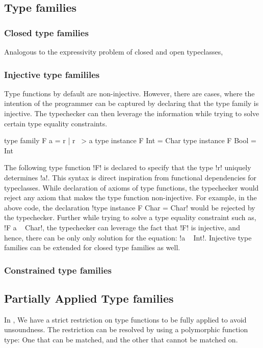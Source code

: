\documentclass[manuscript,screen,nonacm]{acmart}
\begin{document}
\subsection{Type families}
\subsubsection{Closed type families}
Analogous to the expressivity problem of closed and open typeclasses,

\subsubsection{Injective type famililes}
Type functions by default are non-injective. However, there are cases, where the intention of the programmer can be captured by declaring that the type family is injective. The typechecker can then leverage the information while trying to solve certain type equality constraints.

\begin{CenteredBox}
\begin{code}
type family F a = r | r ~> a
type instance F Int = Char
type instance F Bool = Int
\end{code}
\end{CenteredBox}

The following type function !F! is declared to specify that the type !r! uniquely determines !a!. This syntax is direct inspiration from functional dependencies for typeclasses. While declaration of axioms of type functions, the typechecker would reject any axiom that makes the type function non-injective. For example, in the above code, the declaration !type instance F Char = Char! would be rejected by the typechecker. Further while trying to solve a type equality constraint such as, !F a ~ Char!, the typechecker can leverage the fact that !F! is injective, and hence, there can be only only solution for the equation: !a ~ Int!. Injective type families\cite{storalek_injective_2015} can be extended for closed type families as well.

\subsubsection{Constrained type families}

\subsection{Partially Applied Type families}
In \SFC, We have a strict restriction on type functions to be fully applied to avoid unsoundness. The restriction can be resolved by using a polymorphic function type\cite{kiss_higher-order_2019}: One that can be matched, and the other that cannot be matched on.
\end{document}
